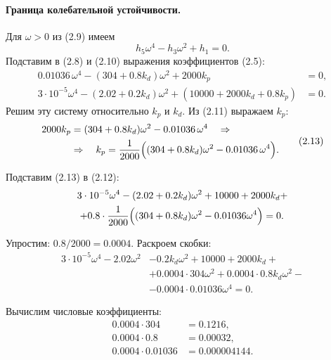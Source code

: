 \documentclass[a4paper, 14pt]{extarticle}
\begin{document}
    \paragraph{Граница колебательной устойчивости.}
    Для $\omega > 0$ из (2.9) имеем
    \[
    h_5 \omega^4 - h_3 \omega^2 + h_1 = 0. \tag{2.10}
    \]
    Подставим в (2.8) и (2.10) выражения коэффициентов (2.5):
    \begin{align}
    0.01036\,\omega^4 - (304 + 0.8k_d)\omega^2 + 2000k_p &= 0, \tag{2.11}\\
    3\cdot10^{-5}\omega^4 - (2.02 + 0.2k_d)\omega^2 + (10000 + 2000k_d + 0.8k_p) &= 0. \tag{2.12}
    \end{align}
    Решим эту систему относительно $k_p$ и $k_d$. Из (2.11) выражаем $k_p$:
\begin{equation}
\begin{split}
2000k_p &= (304 + 0.8k_d)\omega^2 - 0.01036\,\omega^4 \quad \Rightarrow \\
&\Rightarrow \quad k_p = \frac{1}{2000}\Bigl((304 + 0.8k_d)\omega^2 - 0.01036\,\omega^4\Bigr).
\end{split}
\tag{2.13}
\end{equation}

    Подставим (2.13) в (2.12):
\begin{equation}
\begin{split}
3\cdot10^{-5}\omega^4 - (2.02+0.2k_d)\omega^2 &+ 10000 + 2000k_d + \\
+ 0.8\cdot\frac{1}{2000}\Bigl((304+0.8k_d)\omega^2 &- 0.01036\omega^4\Bigr) = 0.
\end{split}
\end{equation}

    Упростим: $0.8/2000 = 0.0004$. Раскроем скобки:
\begin{equation}
\begin{split}
3\cdot10^{-5}\omega^4 - 2.02\omega^2 &- 0.2k_d\omega^2 + 10000 + 2000k_d + \\
&+ 0.0004\cdot304\omega^2 + 0.0004\cdot0.8k_d\omega^2 - \\
&- 0.0004\cdot0.01036\omega^4 = 0.
\end{split}
\end{equation}

    Вычислим числовые коэффициенты:
\begin{align*}
    0.0004 \cdot 304 &= 0.1216, \\
    0.0004 \cdot 0.8 &= 0.00032, \\
    0.0004 \cdot 0.01036 &= 0.000004144.
\end{align*}
\end{document}
